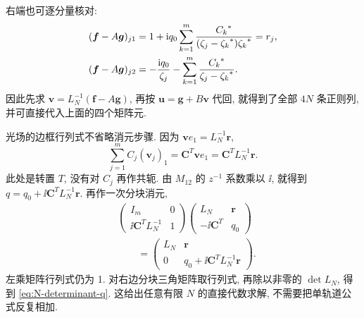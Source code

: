 右端也可逐分量核对:
\begin{equation*}
\begin{aligned}
(\boldsymbol f-A\boldsymbol g)_{j1}
&=1+\mathrm{i} q_0\sum\limits_{k=1}^{m}
\dfrac{{C_k}^{*}}{(\zeta_j-{\zeta_k}^{*}){\zeta_k}^{*}}=r_j,\\
(\boldsymbol f-A\boldsymbol g)_{j2}
&=-\dfrac{\mathrm{i} q_0}{\zeta_j}
-\sum\limits_{k=1}^{m}\dfrac{{C_k}^{*}}{\zeta_j-{\zeta_k}^{*}}.
\end{aligned}
\end{equation*}
因此先求 $\boldsymbol v=L_N^{-1}(\boldsymbol f-A\boldsymbol g)$,
再按 $\boldsymbol u=\boldsymbol g+B\boldsymbol v$ 代回,
就得到了全部 $4N$ 条正则列, 并可直接代入上面的四个矩阵元.

\par\smallskip\noindent 光场的边框行列式不省略消元步骤.\quad
因为 $\boldsymbol v e_1=L_N^{-1}\boldsymbol r$,
\begin{equation*}
\sum\limits_{j=1}^{m}C_j(\mathbf v_j)_1
=\boldsymbol C^T\boldsymbol v e_1
=\boldsymbol C^T L_N^{-1}\boldsymbol r.
\end{equation*}
此处是转置 $T$, 没有对 $C_j$ 再作共轭.
由 $M_{12}$ 的 $z^{-1}$ 系数乘以 $\ii$, 就得到
$q=q_0+\ii\boldsymbol C^T L_N^{-1}\boldsymbol r$.
再作一次分块消元,
\begin{equation*}
\begin{aligned}
&
\begin{pmatrix}I_m&0\\\ii\boldsymbol C^T L_N^{-1}&1\end{pmatrix}
\begin{pmatrix}L_N&\boldsymbol r\\-\ii\boldsymbol C^T&q_0\end{pmatrix}\\
&\qquad=\begin{pmatrix}L_N&\boldsymbol r\\0&q_0+\ii\boldsymbol C^T L_N^{-1}\boldsymbol r\end{pmatrix}.
\end{aligned}
\end{equation*}
左乘矩阵行列式仍为 1. 对右边分块三角矩阵取行列式,
再除以非零的 $\det L_N$, 得到 \eqref{eq:N-determinant-q}.
这给出任意有限 $N$ 的直接代数求解, 不需要把单轨道公式反复相加.

